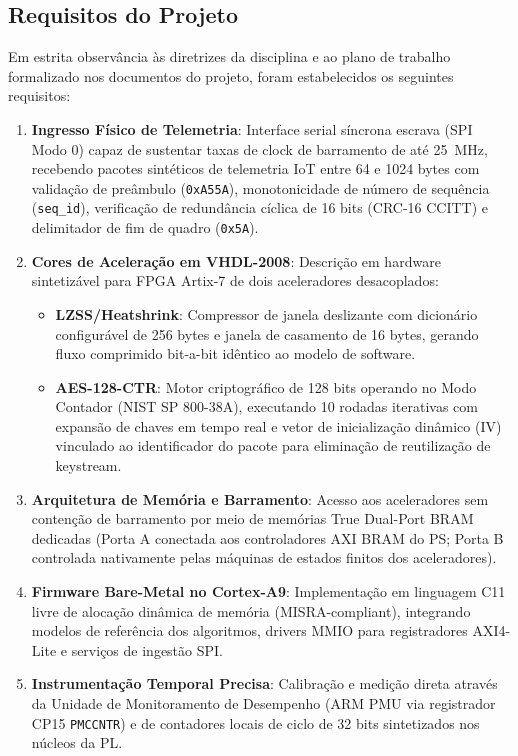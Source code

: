 \documentclass[11pt,a4paper]{article}
\begin{document}
\subsection{Requisitos do Projeto}
Em estrita observância às diretrizes da disciplina e ao plano de trabalho formalizado nos documentos do projeto, foram estabelecidos os seguintes requisitos:
\begin{enumerate}
  \item \textbf{Ingresso Físico de Telemetria}: Interface serial síncrona escrava (SPI Modo 0) capaz de sustentar taxas de clock de barramento de até 25~MHz, recebendo pacotes sintéticos de telemetria IoT entre 64 e 1024 bytes com validação de preâmbulo (\texttt{0xA55A}), monotonicidade de número de sequência (\texttt{seq\_id}), verificação de redundância cíclica de 16 bits (CRC-16 CCITT) e delimitador de fim de quadro (\texttt{0x5A}).
  \item \textbf{Cores de Aceleração em VHDL-2008}: Descrição em hardware sintetizável para FPGA Artix-7 de dois aceleradores desacoplados:
    \begin{itemize}
      \item \textbf{LZSS/Heatshrink}: Compressor de janela deslizante com dicionário configurável de 256 bytes e janela de casamento de 16 bytes, gerando fluxo comprimido bit-a-bit idêntico ao modelo de software.
      \item \textbf{AES-128-CTR}: Motor criptográfico de 128 bits operando no Modo Contador (NIST SP 800-38A), executando 10 rodadas iterativas com expansão de chaves em tempo real e vetor de inicialização dinâmico (IV) vinculado ao identificador do pacote para eliminação de reutilização de keystream.
    \end{itemize}
  \item \textbf{Arquitetura de Memória e Barramento}: Acesso aos aceleradores sem contenção de barramento por meio de memórias True Dual-Port BRAM dedicadas (Porta A conectada aos controladores AXI BRAM do PS; Porta B controlada nativamente pelas máquinas de estados finitos dos aceleradores).
  \item \textbf{Firmware Bare-Metal no Cortex-A9}: Implementação em linguagem C11 livre de alocação dinâmica de memória (MISRA-compliant), integrando modelos de referência dos algoritmos, drivers MMIO para registradores AXI4-Lite e serviços de ingestão SPI.
  \item \textbf{Instrumentação Temporal Precisa}: Calibração e medição direta através da Unidade de Monitoramento de Desempenho (ARM PMU via registrador CP15 \texttt{PMCCNTR}) e de contadores locais de ciclo de 32 bits sintetizados nos núcleos da PL.
\end{enumerate}
\end{document}
